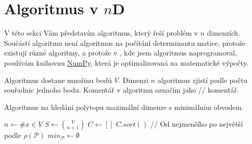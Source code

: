 \section{Algoritmus v \texorpdfstring{$n$D}{nD}}
V této sekci Vám představím algoritmus, který řeší problém v $n$ dimenzích. Součástí algoritmu není algoritmus na počítání determinantu matice, protože existují různé algoritmy, a protože v , kde jsem algoritmus naprogramoval, používám knihovnu \href{https://numpy.org/doc/stable/index.html}{NumPy}, která je optimalizovaná na matematické výpočty. 

Algoritmus dostane množinu bodů $V$. Dimenzi $n$ algoritmus zjistí podle počtu souřadnic jednoho bodu. Komentář v algoritmu označím jako // komentář.

\begin{algorithm}[H]
    \caption{Algoritmus na hledání polytopu maximální dimenze s minimálním obvodem.}
    \label{alg:algoritmus_nd}


    \BlankLine
    \BlankLine

    $n \leftarrow \#x \in V$ \;
    $S \leftarrow \binom{V}{n+1}$\;
    $C \leftarrow []$\; 
    $C.sort()$  // Od nejmenšího po největší podle $\rho(\mathcal{P})$ \;
    $min_\mathcal{P} \leftarrow \emptyset$\;
    \KwReturn{$\emptyset$}\;
   \end{algorithm}